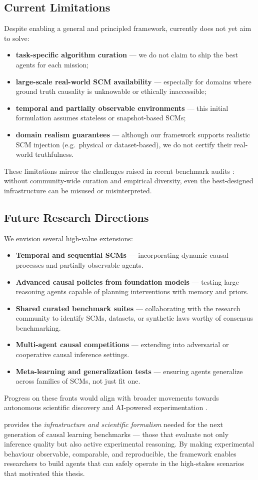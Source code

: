 \subsection{Current Limitations}
Despite enabling a general and principled framework, \game currently does not yet aim to solve:
\begin{itemize}
    \item \textbf{task-specific algorithm curation} — we do not claim to ship the best agents for each mission;
    \item \textbf{large-scale real-world SCM availability} — especially for domains where ground truth causality is unknowable or ethically inaccessible;
    \item \textbf{temporal and partially observable environments} — this initial formulation assumes stateless or snapshot-based SCMs;
    \item \textbf{domain realism guarantees} — although our framework supports realistic SCM injection (e.g.\ physical or dataset-based), we do not certify their real-world truthfulness.
\end{itemize}
These limitations mirror the challenges raised in recent benchmark audits \citep{EvaluationFramework2022,CIPCaDBench2022}: without community-wide curation and empirical diversity, even the best-designed infrastructure can be misused or misinterpreted.

\subsection{Future Research Directions}
We envision several high-value extensions:
\begin{itemize}
    \item \textbf{Temporal and sequential SCMs} — incorporating dynamic causal processes and partially observable agents.
    \item \textbf{Advanced causal policies from foundation models} — testing large reasoning agents capable of planning interventions with memory and priors.
    \item \textbf{Shared curated benchmark suites} — collaborating with the research community to identify SCMs, datasets, or synthetic laws worthy of consensus benchmarking.
    \item \textbf{Multi-agent causal competitions} — extending \game into adversarial or cooperative causal inference settings.
    \item \textbf{Meta-learning and generalization tests} — ensuring agents generalize across families of SCMs, not just fit one.
\end{itemize}
Progress on these fronts would align \game with broader movements towards autonomous scientific discovery and AI-powered experimentation \citep{annadani2023bayesdag,Shojaee2023TransformerbasedPFA}.

\medskip
\game provides the \emph{infrastructure and scientific formalism} needed for the next generation of causal learning benchmarks — those that evaluate not only inference quality but also active experimental reasoning. By making experimental behaviour observable, comparable, and reproducible, the framework enables researchers to build agents that can safely operate in the high-stakes scenarios that motivated this thesis.
